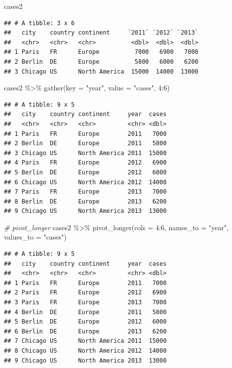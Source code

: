 \documentclass[
]{article}
\newenvironment{Shaded}{\begin{snugshade}}{\end{snugshade}}
\newcommand{\AttributeTok}[1]{\textcolor[rgb]{0.77,0.63,0.00}{#1}}
\newcommand{\CommentTok}[1]{\textcolor[rgb]{0.56,0.35,0.01}{\textit{#1}}}
\newcommand{\DecValTok}[1]{\textcolor[rgb]{0.00,0.00,0.81}{#1}}
\newcommand{\FunctionTok}[1]{\textcolor[rgb]{0.00,0.00,0.00}{#1}}
\newcommand{\NormalTok}[1]{#1}
\newcommand{\SpecialCharTok}[1]{\textcolor[rgb]{0.00,0.00,0.00}{#1}}
\newcommand{\StringTok}[1]{\textcolor[rgb]{0.31,0.60,0.02}{#1}}
\begin{document}
\begin{Shaded}
\begin{Highlighting}[]
\NormalTok{cases2}
\end{Highlighting}
\end{Shaded}

\begin{verbatim}
## # A tibble: 3 x 6
##   city    country continent     `2011` `2012` `2013`
##   <chr>   <chr>   <chr>          <dbl>  <dbl>  <dbl>
## 1 Paris   FR      Europe          7000   6900   7000
## 2 Berlin  DE      Europe          5800   6000   6200
## 3 Chicago US      North America  15000  14000  13000
\end{verbatim}

\begin{Shaded}
\begin{Highlighting}[]
\NormalTok{cases2 }\SpecialCharTok{\%\textgreater{}\%} \FunctionTok{gather}\NormalTok{(}\AttributeTok{key =} \StringTok{"year"}\NormalTok{, }\AttributeTok{value =} \StringTok{"cases"}\NormalTok{, }\DecValTok{4}\SpecialCharTok{:}\DecValTok{6}\NormalTok{)}
\end{Highlighting}
\end{Shaded}

\begin{verbatim}
## # A tibble: 9 x 5
##   city    country continent     year  cases
##   <chr>   <chr>   <chr>         <chr> <dbl>
## 1 Paris   FR      Europe        2011   7000
## 2 Berlin  DE      Europe        2011   5800
## 3 Chicago US      North America 2011  15000
## 4 Paris   FR      Europe        2012   6900
## 5 Berlin  DE      Europe        2012   6000
## 6 Chicago US      North America 2012  14000
## 7 Paris   FR      Europe        2013   7000
## 8 Berlin  DE      Europe        2013   6200
## 9 Chicago US      North America 2013  13000
\end{verbatim}

\begin{Shaded}
\begin{Highlighting}[]
\CommentTok{\# pivot\_longer}
\NormalTok{cases2 }\SpecialCharTok{\%\textgreater{}\%} \FunctionTok{pivot\_longer}\NormalTok{(}\AttributeTok{cols =} \DecValTok{4}\SpecialCharTok{:}\DecValTok{6}\NormalTok{, }\AttributeTok{names\_to =} \StringTok{"year"}\NormalTok{, }\AttributeTok{values\_to =} \StringTok{"cases"}\NormalTok{)}
\end{Highlighting}
\end{Shaded}

\begin{verbatim}
## # A tibble: 9 x 5
##   city    country continent     year  cases
##   <chr>   <chr>   <chr>         <chr> <dbl>
## 1 Paris   FR      Europe        2011   7000
## 2 Paris   FR      Europe        2012   6900
## 3 Paris   FR      Europe        2013   7000
## 4 Berlin  DE      Europe        2011   5800
## 5 Berlin  DE      Europe        2012   6000
## 6 Berlin  DE      Europe        2013   6200
## 7 Chicago US      North America 2011  15000
## 8 Chicago US      North America 2012  14000
## 9 Chicago US      North America 2013  13000
\end{verbatim}
\end{document}
